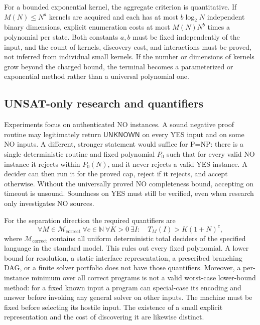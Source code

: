 \documentclass[11pt,letterpaper]{article}
\theoremstyle{definition}
\newcommand{\UNK}{\ensuremath{\mathsf{UNKNOWN}}}
\begin{document}
For a bounded exponential kernel, the aggregate criterion is quantitative. If \(M(N)\le N^a\) kernels are acquired and each has at most \(b\log_2 N\) independent binary dimensions, explicit enumeration costs at most \(M(N)N^b\) times a polynomial per state. Both constants \(a,b\) must be fixed independently of the input, and the count of kernels, discovery cost, and interactions must be proved, not inferred from individual small kernels. If the number or dimensions of kernels grow beyond the charged bound, the terminal becomes a parameterized or exponential method rather than a universal polynomial one.

\subsection{UNSAT-only research and quantifiers}\label{sec:unsat}
Experiments focus on authenticated NO instances. A sound negative proof routine may legitimately return \(\UNK\) on every YES input and on some NO inputs. A different, stronger statement would suffice for P=NP: there is a single deterministic routine and fixed polynomial \(P_0\) such that for every valid NO instance it rejects within \(P_0(N)\), and it never rejects a valid YES instance. A decider can then run it for the proved cap, reject if it rejects, and accept otherwise. Without the universally proved NO completeness bound, accepting on timeout is unsound. Soundness on YES must still be verified, even when research only investigates NO sources.

For the separation direction the required quantifiers are
\begin{equation}\label{eq:lowerquant}
 \forall M\in\mathcal M_{\mathrm{correct}}\ \forall c\in\mathbb N\ \forall K>0\ \exists I:\quad T_M(I)>K(1+N)^c,
\end{equation}
where \(\mathcal M_{\mathrm{correct}}\) contains all uniform deterministic total deciders of the specified language in the standard model. This rules out every fixed polynomial. A lower bound for resolution, a static interface representation, a prescribed branching DAG, or a finite solver portfolio does not have those quantifiers. Moreover, a per-instance minimum over all correct programs is not a valid worst-case lower-bound method: for a fixed known input a program can special-case its encoding and answer before invoking any general solver on other inputs. The machine must be fixed before selecting its hostile input. The existence of a small explicit representation and the cost of discovering it are likewise distinct.
\end{document}
